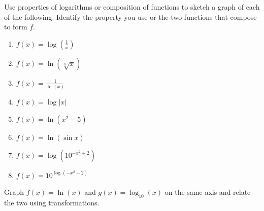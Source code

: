 \documentclass[10pt,]{book}
\theoremstyle{ptxdefinitionnotitle}
\theoremstyle{ptxdefinitiontitle}
\theoremstyle{ptxdefinitionnotitle}
\theoremstyle{ptxdefinitiontitle}
\theoremstyle{ptxdefinitionnotitle}
\theoremstyle{ptxdefinitiontitle}
\numberwithin{equation}{section}
\begin{document}
\begin{divisionexercise}{9}\hypertarget{exercise-99}{}
\hypertarget{p-365}{}%
Use properties of logarithms or composition of functions to sketch a graph of each of the following. Identify the property you use or the two functions that compose to form \(f\). \leavevmode%
\begin{enumerate}[label=(\alph*)]
\item\hypertarget{li-272}{}\(f(x) = \log \left( \frac{1}{x} \right)\)%
\item\hypertarget{li-273}{}\(f(x) = \ln \left( \sqrt[3]{x} \right)\)%
\item\hypertarget{li-274}{}\(f(x) = \frac{1}{\ln \left( x \right)}\)%
\item\hypertarget{li-275}{}\(f(x) = \log \left| x \right|\)%
\item\hypertarget{li-276}{}\(f(x) = \ln \left( x^2 - 5 \right)\)%
\item\hypertarget{li-277}{}\(f(x) = \ln \left( \sin x \right)\)%
\item\hypertarget{li-278}{}\(f(x) = \log \left( 10^{-x^2 + 2} \right)\)%
\item\hypertarget{li-279}{}\(f(x) = 10^{\log \left( -x^2 +2 \right)}\)%
\end{enumerate}
%
\end{divisionexercise}%
\begin{divisionexercise}{10}\hypertarget{exercise-100}{}
\hypertarget{p-366}{}%
Graph \(f(x) = \ln \left( x \right)\) and \(g(x) = \log_{10} \left( x \right)\) on the same axis and relate the two using transformations.%
\end{divisionexercise}%
\typeout{************************************************}
\typeout{************************************************}
\end{document}

